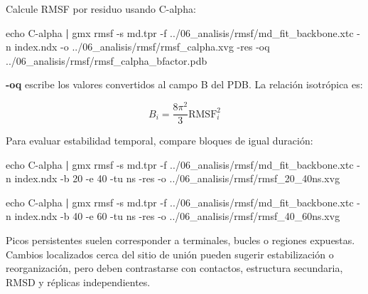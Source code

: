 \documentclass[
  spanish,
  11pt,
  a4paper]{article}
\newenvironment{Shaded}{\begin{snugshade}}{\end{snugshade}}
\newcommand{\AttributeTok}[1]{\textcolor[rgb]{0.13,0.29,0.53}{#1}}
\newcommand{\BuiltInTok}[1]{#1}
\newcommand{\ExtensionTok}[1]{#1}
\newcommand{\KeywordTok}[1]{\textcolor[rgb]{0.13,0.29,0.53}{\textbf{#1}}}
\newcommand{\NormalTok}[1]{#1}
\begin{document}
Calcule RMSF por residuo usando C-alpha:

\begin{Shaded}
\begin{Highlighting}[]
\BuiltInTok{echo}\NormalTok{ C{-}alpha }\KeywordTok{|}
\ExtensionTok{gmx}\NormalTok{ rmsf     }\AttributeTok{{-}s}\NormalTok{ md.tpr     }\AttributeTok{{-}f}\NormalTok{ ../06\_analisis/rmsf/md\_fit\_backbone.xtc     }\AttributeTok{{-}n}\NormalTok{ index.ndx     }\AttributeTok{{-}o}\NormalTok{ ../06\_analisis/rmsf/rmsf\_calpha.xvg     }\AttributeTok{{-}res}     \AttributeTok{{-}oq}\NormalTok{ ../06\_analisis/rmsf/rmsf\_calpha\_bfactor.pdb}
\end{Highlighting}
\end{Shaded}

\textbf{-oq} escribe los valores convertidos al campo B del PDB. La
relación isotrópica es:

\[
B_i=\frac{8\pi^2}{3}\mathrm{RMSF}_i^2
\]

Para evaluar estabilidad temporal, compare bloques de igual duración:

\begin{Shaded}
\begin{Highlighting}[]
\BuiltInTok{echo}\NormalTok{ C{-}alpha }\KeywordTok{|}
\ExtensionTok{gmx}\NormalTok{ rmsf     }\AttributeTok{{-}s}\NormalTok{ md.tpr     }\AttributeTok{{-}f}\NormalTok{ ../06\_analisis/rmsf/md\_fit\_backbone.xtc     }\AttributeTok{{-}n}\NormalTok{ index.ndx     }\AttributeTok{{-}b}\NormalTok{ 20     }\AttributeTok{{-}e}\NormalTok{ 40     }\AttributeTok{{-}tu}\NormalTok{ ns     }\AttributeTok{{-}res}     \AttributeTok{{-}o}\NormalTok{ ../06\_analisis/rmsf/rmsf\_20\_40ns.xvg}

\BuiltInTok{echo}\NormalTok{ C{-}alpha }\KeywordTok{|}
\ExtensionTok{gmx}\NormalTok{ rmsf     }\AttributeTok{{-}s}\NormalTok{ md.tpr     }\AttributeTok{{-}f}\NormalTok{ ../06\_analisis/rmsf/md\_fit\_backbone.xtc     }\AttributeTok{{-}n}\NormalTok{ index.ndx     }\AttributeTok{{-}b}\NormalTok{ 40     }\AttributeTok{{-}e}\NormalTok{ 60     }\AttributeTok{{-}tu}\NormalTok{ ns     }\AttributeTok{{-}res}     \AttributeTok{{-}o}\NormalTok{ ../06\_analisis/rmsf/rmsf\_40\_60ns.xvg}
\end{Highlighting}
\end{Shaded}

Picos persistentes suelen corresponder a terminales, bucles o regiones
expuestas. Cambios localizados cerca del sitio de unión pueden sugerir
estabilización o reorganización, pero deben contrastarse con contactos,
estructura secundaria, RMSD y réplicas independientes.
\end{document}
